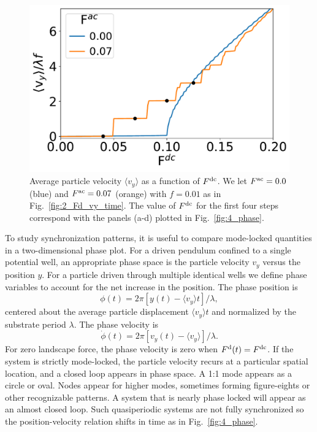 \documentclass[preprint,showpacs,preprintnumbers,amsmath,amssymb,aps,prb]{revtex4-1}
\theoremstyle{remark}
\begin{document}
\begin{figure}[h]
\centering
\includegraphics[width=\columnwidth]{fig3_sweep_vyFDC.pdf}
\caption{Average particle velocity  $\langle v_{y} \rangle$
  as a function of $F^{\rm dc}$.
  We let
  $F^{\rm ac}=0.0$ (blue) and 
  $F^{\rm ac}=0.07$ (orange) with $f = 0.01$ 
  as in Fig.~\ref{fig:2_Fd_vy_time}.
  The value of $F^{\rm dc}$ for the first four steps
  correspond with the
  panels (a-d) 
  plotted in Fig.~\ref{fig:4_phase}.
}
\label{fig:3_sweep_vyFDC}
\end{figure}

  To study synchronization patterns, 
  it is useful to compare
  mode-locked quantities 
  in a two-dimensional phase plot. 
  For a driven pendulum confined to a single potential well,
  an appropriate
  phase space is the particle velocity $v_y$ versus the position $y$.  
  For a particle driven 
  through multiple identical wells 
  we define phase variables 
  to account for the net increase in the position.
  The phase position is
  \begin{equation}
    \phi(t) = 2\pi [y(t)-\langle v_y \rangle t]/\lambda,
  \end{equation}
  centered about the average particle displacement $\langle v_y \rangle t$
  and normalized by the substrate period $\lambda$.\cite{Juniper2015}
  The phase velocity is
  \begin{equation}
    \dot{\phi}(t) =2\pi [v_y(t)-\langle v_y \rangle] /\lambda.  
  \end{equation}
  For zero landscape force, 
  the phase velocity  is zero when $F^{\rm d}(t) = F^{\rm dc}$.
  If the system
  is strictly mode-locked,
  the particle velocity
  recurs at a particular spatial location, and 
  a closed loop appears in  
  phase space. 
  A 1:1 mode appears as a circle or oval. 
  Nodes appear 
  for higher modes,
  sometimes forming figure-eights
  or other recognizable patterns.
  A system that is nearly phase locked
  will appear as an almost closed loop.
  Such quasiperiodic systems are
  not fully synchronized
  so the position-velocity relation
  shifts in time as in Fig.~\ref{fig:4_phase}.
  
\end{document}
